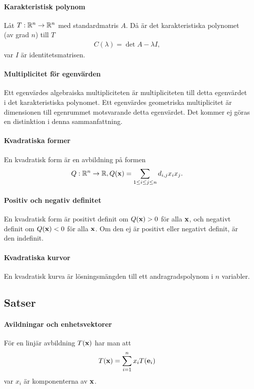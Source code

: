 \paragraph{Karakteristisk polynom}
Låt $T: \mathbb{R}^n\to\mathbb{R}^n$ med standardmatris $A$. Då är det karakteristiska polynomet (av grad $n$) till $T$
\begin{align*}
	C(\lambda) = \det{A - \lambda I},
\end{align*}
var $I$ är identitetsmatrisen.

\paragraph{Multiplicitet för egenvärden}
Ett egenvärdes algebraiska multipliciteten är multipliciteten till detta egenvärdet i det karakteristiska polynomet. Ett egenvärdes geometriska multiplicitet är dimensionen till egenrummet motsvarande detta egenvärdet. Det kommer ej göras en distinktion i denna sammanfattning.

\paragraph{Kvadratiska former}
En kvadratisk form är en avbildning på formen
\begin{align*}
	Q: \R^n\to\R, Q(\vect{x}) = \sum\limits_{1\leq i\leq j\leq n}d_{i, j}x_ix_j.
\end{align*}

\paragraph{Positiv och negativ definitet}
En kvadratisk form är positivt definit om $Q(\vect{x}) > 0$ för alla $\vect{x}$, och negativt definit om $Q(\vect{x}) < 0$ för alla $\vect{x}$. Om den ej är positivt eller negativt definit, är den indefinit.

\paragraph{Kvadratiska kurvor}
En kvadratisk kurva är lösningsmängden till ett andragradspolynom i $n$ variabler.

\subsection{Satser}

\paragraph{Avildningar och enhetsvektorer}
För en linjär avbildning $T(\vect{x})$ har man att
\begin{align*}
	T(\vect{x}) = \sum\limits_{i = 1}^{n} x_iT(\vect{e}_i)
\end{align*}
var $x_i$ är komponenterna av $\vect{x}$.

